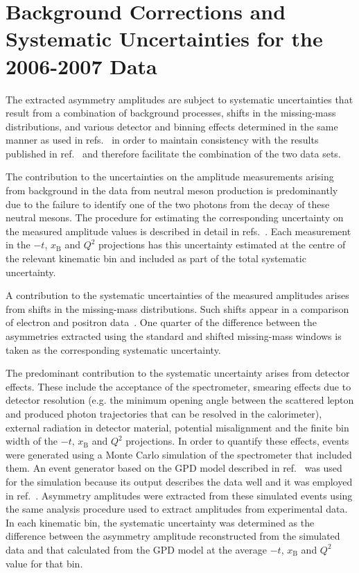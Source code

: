 \documentclass[11pt,a4paper]{article}
\begin{document}
\section{Background Corrections and Systematic Uncertainties for the
  2006-2007 Data}
The extracted asymmetry amplitudes are subject to systematic uncertainties that result from a combination of background processes, shifts in the missing-mass distributions, and various detector and binning effects determined in the same manner as used in refs.~\cite{Air08,Air09} in order to maintain consistency with the results published in ref.~\cite{Air09} and therefore facilitate the combination of the two data sets.

The contribution to the uncertainties on the amplitude measurements
arising from background in the data from neutral meson
production is predominantly due to the failure to identify one of
  the two photons from the decay of these neutral mesons. The procedure for estimating the corresponding
uncertainty on the measured amplitude values is described in detail in
refs.~\cite{Air08,Air09}. Each measurement in the $-t$, $x_{\textrm{B}}$ and
  $Q^{2}$ projections has this uncertainty estimated at the
  centre of the relevant kinematic bin and included as part of the
  total systematic uncertainty.

A contribution to the systematic uncertainties of the
  measured amplitudes arises from shifts in  the
missing-mass distributions. Such shifts appear in a comparison of electron and positron data~\cite{Zei09,Bur10}. One
quarter of the difference between the asymmetries extracted using the standard
and shifted missing-mass windows is taken as the corresponding systematic
uncertainty. 

The predominant contribution to the systematic uncertainty arises from detector
effects. These include the acceptance of the spectrometer, smearing
effects due to detector resolution (e.g. the minimum opening angle between the scattered lepton and produced photon trajectories that can be resolved in the calorimeter), external radiation in detector material, potential misalignment and the finite bin width of the $-t$, $x_{\textrm{B}}$ and $Q^{2}$ projections. In order to quantify these effects, events were generated using a Monte Carlo simulation of the spectrometer that included them. An event generator based on the GPD model described in ref.~\cite{Guz06} was used for the simulation because its output describes the data well and it was employed in ref.~\cite{Air09}. Asymmetry amplitudes were extracted from these simulated events using the same analysis procedure used to
extract amplitudes from experimental data. In each kinematic bin, the
systematic uncertainty was determined as the difference between the asymmetry amplitude reconstructed from the simulated data and that
calculated from the GPD model at the average $-t$, $x_{\textrm{B}}$ and
$Q^{2}$ value for that bin.
\end{document}

